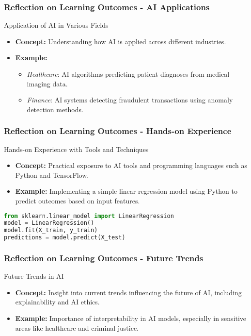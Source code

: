 \documentclass{beamer}
\begin{document}
\begin{frame}
    \frametitle{Reflection on Learning Outcomes - AI Applications}
    \begin{block}{Application of AI in Various Fields}
        \begin{itemize}
            \item \textbf{Concept:} Understanding how AI is applied across different industries.
            \item \textbf{Example:} 
            \begin{itemize}
                \item \textit{Healthcare}: AI algorithms predicting patient diagnoses from medical imaging data.
                \item \textit{Finance}: AI systems detecting fraudulent transactions using anomaly detection methods.
            \end{itemize}
        \end{itemize}
    \end{block}
\end{frame}

\begin{frame}[fragile]
    \frametitle{Reflection on Learning Outcomes - Hands-on Experience}
    \begin{block}{Hands-on Experience with Tools and Techniques}
        \begin{itemize}
            \item \textbf{Concept:} Practical exposure to AI tools and programming languages such as Python and TensorFlow.
            \item \textbf{Example:} Implementing a simple linear regression model using Python to predict outcomes based on input features.
        \end{itemize}
        \begin{lstlisting}[language=Python]
from sklearn.linear_model import LinearRegression
model = LinearRegression()
model.fit(X_train, y_train)
predictions = model.predict(X_test)
        \end{lstlisting}
    \end{block}
\end{frame}

\begin{frame}
    \frametitle{Reflection on Learning Outcomes - Future Trends}
    \begin{block}{Future Trends in AI}
        \begin{itemize}
            \item \textbf{Concept:} Insight into current trends influencing the future of AI, including explainability and AI ethics.
            \item \textbf{Example:} Importance of interpretability in AI models, especially in sensitive areas like healthcare and criminal justice.
        \end{itemize}
    \end{block}
\end{frame}
\end{document}
